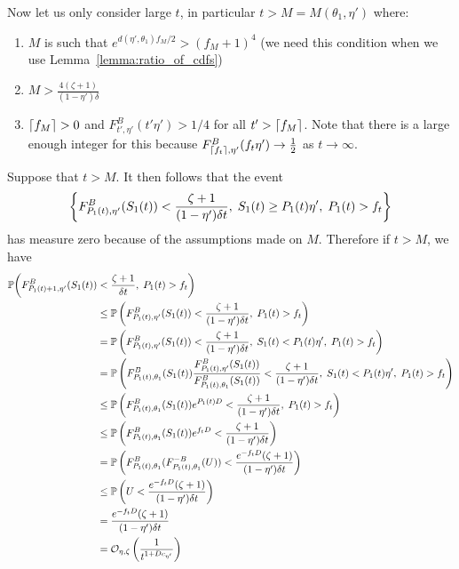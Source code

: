\begin{myproof}[Proof.]
	Now let us only consider large $t$, in particular $t > M = M(\theta_1, \eta')$ where:
	\begin{enumerate}
		\item $M$ is such that $e^{d(\eta', \theta_1)f_{M}/2} > (f_M + 1)^4$ (we need this condition when we use Lemma~\ref{lemma:ratio_of_cdfs})
		\item $M > \frac{4(\zeta + 1)}{(1-\eta')\delta }$
		\item $\lceil f_M\rceil > 0$ and $F^B_{t',\eta'}(t' \eta') > 1/4$ for all $t' > \lceil f_M\rceil$. Note that there is a large enough integer for this because $F^B_{\lceil f_t\rceil,\eta'}(f_t \eta') \to \frac{1}{2}$ as $t \to \infty$.
	\end{enumerate} 
	Suppose that $t > M$. It then follows that the event \[\left\{F^B_{P_{1}(t), \eta'}(S_1(t)) < \frac{\zeta + 1}{(1-\eta')\delta t},\; S_1(t) \ge P_{1}(t) \eta', \; P_{1}(t) > f_t\right\}\] has measure zero because of the assumptions made on $M$. Therefore if $t > M$, we have
	\begin{align}
	\mathbb{P}\bigg(F^B_{\Nt{1}+1,  \eta'}(S_1(t)) &< \frac{\zeta + 1}{\delta t }  , \; \Nt{1} > f_t \bigg) \nonumber \\
	& \le \P{F^B_{\Nt{1},  \eta'}(S_1(t)) < \frac{\zeta + 1}{(1-\eta')\delta t}, \; \Nt{1} > f_t} \label{eqn:part1_decomp_the_cdf_of_y} \\ 
	& = \P{F^B_{\Nt{1},  \eta'}(S_1(t)) < \frac{\zeta + 1}{(1-\eta')\delta t}, \; S_1(t) < \Nt{1} \eta', \; \Nt{1} > f_t} \nonumber \\ 
	& =  \P{F^B_{\Nt{1},\theta_1}(S_1(t)) \frac{F^B_{\Nt{1},\eta'}(S_1(t))}{F^B_{\Nt{1},\theta_1}(S_1(t))} < \frac{\zeta + 1}{(1-\eta')\delta  t}, \;S_1(t) < \Nt{1} \eta', \; \Nt{1} > f_t} \nonumber \\
	& \le  \P{F_{\Nt{1},\theta_1}^B(S_1(t))  e^{\Nt{1} D} < \frac{\zeta + 1}{(1-\eta')\delta  t} , \; \Nt{1} > f_t} \label{eqn:part1_app_of_lemma2} \\
	& \le  \P{F_{\Nt{1},\theta_1}^B(S_1(t)) e^{f_t D} < \frac{\zeta + 1}{(1-\eta')\delta  t}} \nonumber \\
	& =  \P{F_{\Nt{1},\theta_1}^B(F^{-B}_{\Nt{1},\theta_1}(U)) < \frac{e^{-f_t D}(\zeta + 1)}{(1-\eta')\delta  t} } \label{eqn:part1_propert_of_inverse_sampling}\\
	& \le  \P{U < \frac{e^{-f_t D}(\zeta + 1)}{(1-\eta')\delta  t} } \nonumber \\  
	& =  \frac{e^{-f_t D}(\zeta + 1)}{(1-\eta')\delta  t} \nonumber  \nonumber\\
	& = \mathcal O_{\eta, \zeta}\left( \frac{1}{t^{1+Dc_{\eta'}}} \right)  \label{bound:one_over_t_plus_eps} 

\end{align}
\end{myproof}
